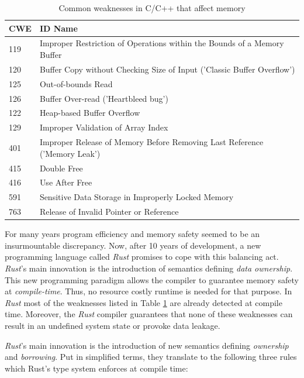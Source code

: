 \documentclass[final,5p,times,twocolumn]{elsarticle}
\begin{document}
\begin{table}[htbp]
\begin{center}
\begin{tabular}{ | l  p{6.5cm} | }
\hline
CWE	& ID Name \\ \hline
\hline
119	& Improper Restriction of Operations within the Bounds of a Memory 
      Buffer\\ \hline
120 & Buffer Copy without Checking Size of Input ('Classic Buffer 
      Overflow')\\ \hline
125 & Out-of-bounds Read\\ \hline
126 & Buffer Over-read ('Heartbleed bug')\\ \hline
122 & Heap-based Buffer Overflow\\ \hline
129 & Improper Validation of Array Index\\ \hline
401 & Improper Release of Memory Before Removing Last Reference ('Memory 
      Leak')\\ \hline
415 & Double Free\\ \hline
416 & Use After Free\\ \hline
591 & Sensitive Data Storage in Improperly Locked Memory\\ \hline
763 & Release of Invalid Pointer or Reference\\ \hline
\end{tabular}
\end{center}
    \caption{Common weaknesses in C/C++ that affect memory}
    \label{tab:c-memory-safety-bugs}
\end{table}


For many years program efficiency and memory safety seemed to be an
insurmountable discrepancy. Now, after 10 years of development, a new
programming language called \emph{Rust} promises to cope with this balancing
act. \emph{Rust}'s main innovation is the introduction of semantics defining
\emph{data ownership}. This new programming paradigm allows the compiler to
guarantee memory safety at \emph{compile-time}.  Thus, no resource costly
runtime is needed for that purpose. In \emph{Rust} most of the weaknesses listed
in Table \ref{tab:c-memory-safety-bugs} are already detected at compile time.
Moreover, the \emph{Rust} compiler guarantees that none of these weaknesses
can result in an undefined system state or provoke data leakage.

\emph{Rust}'s main innovation is the introduction of new semantics defining
\emph{ownership} and \emph{borrowing}. Put in simplified terms, they
translate to the following three rules which Rust's type system enforces at
compile time:
\end{document}
